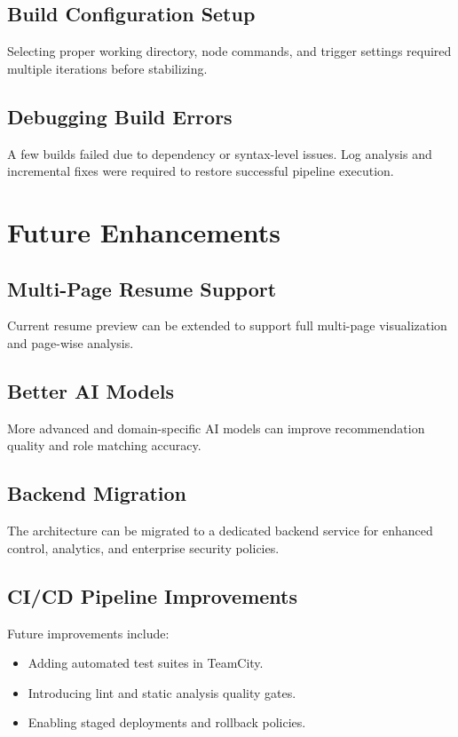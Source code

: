 \documentclass[12pt,a4paper]{report}
\begin{document}
\section{Build Configuration Setup}
Selecting proper working directory, node commands, and trigger settings required multiple iterations before stabilizing.

\section{Debugging Build Errors}
A few builds failed due to dependency or syntax-level issues. Log analysis and incremental fixes were required to restore successful pipeline execution.

\chapter{Future Enhancements}
\section{Multi-Page Resume Support}
Current resume preview can be extended to support full multi-page visualization and page-wise analysis.

\section{Better AI Models}
More advanced and domain-specific AI models can improve recommendation quality and role matching accuracy.

\section{Backend Migration}
The architecture can be migrated to a dedicated backend service for enhanced control, analytics, and enterprise security policies.

\section{CI/CD Pipeline Improvements}
Future improvements include:
\begin{itemize}[leftmargin=1.2cm]
    \item Adding automated test suites in TeamCity.
    \item Introducing lint and static analysis quality gates.
    \item Enabling staged deployments and rollback policies.
\end{itemize}
\end{document}
